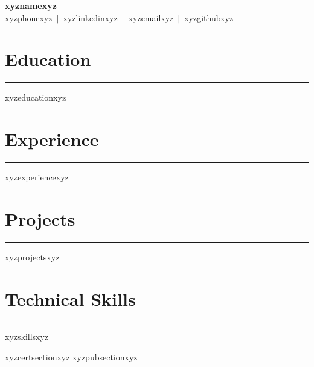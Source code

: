 \documentclass[11pt,letterpaper]{article}
\begin{document}
{\centering
{\huge\textbf{xyznamexyz}}\\[4pt]
xyzphonexyz\ $|$\ xyzlinkedinxyz\ $|$\ xyzemailxyz\ $|$\ xyzgithubxyz\\
}

\vspace{4pt}

\section*{Education}
\vspace{-8pt}\hrule\vspace{4pt}
xyzeducationxyz

\section*{Experience}
\vspace{-8pt}\hrule\vspace{4pt}
xyzexperiencexyz

\section*{Projects}
\vspace{-8pt}\hrule\vspace{4pt}
xyzprojectsxyz

\section*{Technical Skills}
\vspace{-8pt}\hrule\vspace{4pt}
\begin{itemize}[leftmargin=1.5em,itemsep=1pt,topsep=2pt]
xyzskillsxyz
\end{itemize}

xyzcertsectionxyz
xyzpubsectionxyz
\end{document}
